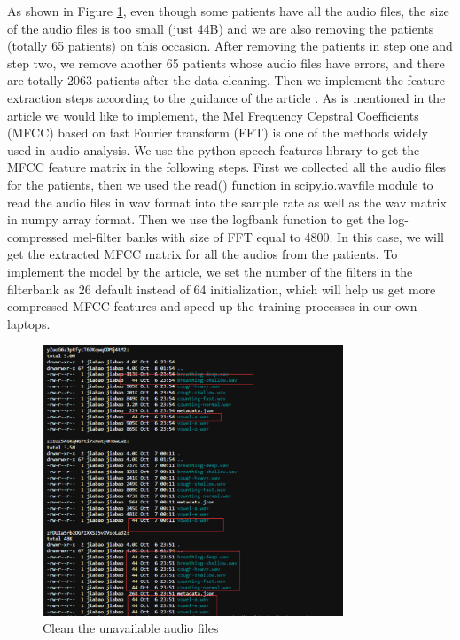 \documentclass[11pt]{article}
\begin{document}
As shown in Figure \ref{fig:clean_unavailable_audio}, even though some patients have all the audio files, the size of the audio files is too small (just 44B) and we are also removing the patients (totally 65 patients) on this occasion. After removing the patients in step one and step two, we remove another 65 patients whose audio files have errors, and there are totally 2063 patients after the data cleaning.
Then we implement the feature extraction steps according to the guidance of the article \cite{xue2021exploring}. As is mentioned in the article we would like to implement, the Mel Frequency Cepstral Coefficients (MFCC) based on fast Fourier transform (FFT) is one of the methods widely used in audio analysis. We use the python speech features library \cite{pyspeech} to get the MFCC feature matrix in the following steps. First we collected all the audio files for the patients, then we used the read() function in scipy.io.wavfile module to read the audio files in wav format into the sample rate as well as the wav matrix in numpy array format. Then we use the logfbank function to get the log-compressed mel-filter banks with size of FFT equal to 4800. In this case, we will get the extracted MFCC matrix for all the audios from the patients. To implement the model by the article, we set the number of the filters in the filterbank as 26 default instead of 64 initialization, which will help us get more compressed MFCC features and speed up the training processes in our own laptops.

\begin{figure}[htbp]{}
	\centering
    \includegraphics[width=0.8\textwidth]{./imgs/mfccFig1-new.png} %
    \caption{Clean the unavailable audio files}
    \label{fig:clean_unavailable_audio}
\end{figure}
\end{document}
